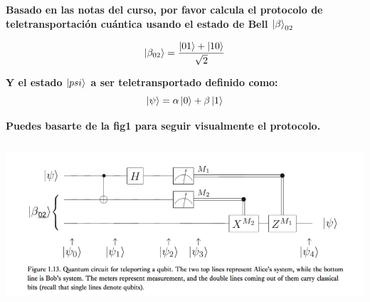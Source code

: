 \textbf{Basado en las notas del curso, por favor calcula el protocolo de
teletransportación cuántica usando el estado de Bell $\ket{\beta}_{02}$}\vspace{.2cm}

\[
    \ket{\beta_{02}} = \displaystyle\frac{\ket{01}+\ket{10}}{\sqrt{2}}  
\]

\textbf{Y el estado $\ket{psi}$ a ser teletransportado definido como:}
\[
    \ket{\psi} = \alpha \ket{0} + \beta \ket{1}  
\]

\textbf{Puedes basarte de la fig1 para seguir visualmente el protocolo.}
 
\begin{center}
    \includegraphics[height=6cm]{src/Img/1.png}
\end{center}
